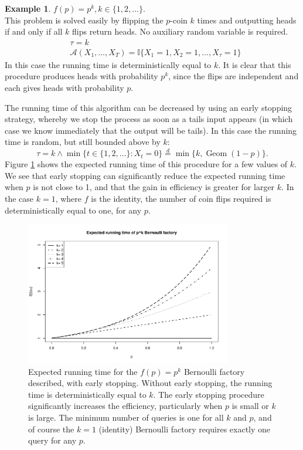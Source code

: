 \documentclass{article}
\theoremstyle{definition}
\newtheorem{example}{Example}
\newcommand{\eqdist}{\overset{d}{=}}
\newcommand{\Geom}{\operatorname{Geom}}
\newcommand{\A}{\mathcal{A}}
\begin{document}
\begin{example}\label{ex:bf_pk}
$f(p) = p^k, k\in\{1,2,\dots\}$.\\
This problem is solved easily by flipping the $p$-coin $k$ times and outputting heads if and only if all $k$ flips return heads. No auxiliary random variable is required.
\begin{align*}
& \tau = k \\
& \A(X_1,\dots,X_T) = \mathbb{I}\{X_1 =1, X_2=1 ,\dots,X_\tau=1\}
\end{align*}
In this case the running time is deterministically equal to $k$. It is clear that this procedure produces heads with probability $p^k$, since the flips are independent and each gives heads with probability $p$.

The running time of this algorithm can be decreased by using an early stopping strategy, whereby we stop the process as soon as a tails input appears (in which case we know immediately that the output will be tails). In this case the running time is random, but still bounded above by $k$:
\begin{equation*}
\tau = k \wedge \min\{t \in \{1,2,\dots\}:X_t=0 \} \eqdist \min\{k, \Geom(1-p)\}.
\end{equation*}
Figure \ref{fig:p2_runtime} shows the expected running time of this procedure for a few values of $k$. We see that early stopping can significantly reduce the expected running time when $p$ is not close to 1, and that the gain in efficiency is greater for larger $k$. In the case $k=1$, where $f$ is the identity, the number of coin flips required is deterministically equal to one, for any $p$.
\begin{figure}
\centering
\includegraphics[width=0.8\textwidth]{pk_runtime.pdf}
\caption{Expected running time for the $f(p)=p^k$ Bernoulli factory described, with early stopping. Without early stopping, the running time is deterministically equal to $k$. The early stopping procedure significantly increases the efficiency, particularly when $p$ is small or $k$ is large. The minimum number of queries is one for all $k$ and $p$, and of course the $k=1$ (identity) Bernoulli factory requires exactly one query for any $p$.}\label{fig:p2_runtime}
\end{figure}
\end{example}
\end{document}
